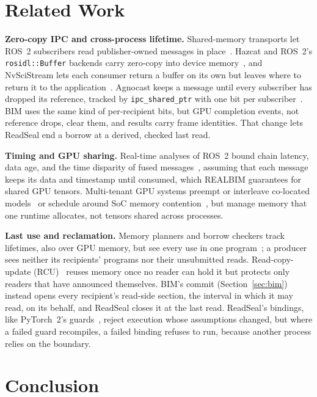 \documentclass[conference]{IEEEtran}
\newcommand{\sys}{REALBIM}
\newcommand{\code}[1]{\texttt{#1}}
\begin{document}
\section{Related Work}
\label{sec:related}

\textbf{Zero-copy IPC and cross-process lifetime.} Shared-memory transports let ROS~2 subscribers read publisher-owned messages in place~\cite{agnocast,luotcad}. Hazcat and ROS~2's \code{rosidl::Buffer} backends carry zero-copy into device memory~\cite{hazcat,cudabackend}, and NvSciStream lets each consumer return a buffer on its own but leaves where to return it to the application~\cite{nvscistream}. Agnocast keeps a message until every subscriber has dropped its reference, tracked by \code{ipc\_shared\_ptr} with one bit per subscriber~\cite{ipcsharedptr}. BIM uses the same kind of per-recipient bits, but GPU completion events, not reference drops, clear them, and results carry frame identities. That change lets ReadSeal end a borrow at a derived, checked last read.

\textbf{Timing and GPU sharing.} Real-time analyses of ROS~2 bound chain latency, data age, and the time disparity of fused messages~\cite{ros2survey}, assuming that each message keeps its data and timestamp until consumed, which \sys{} guarantees for shared GPU tensors. Multi-tenant GPU systems preempt or interleave co-located models~\cite{reef,orion} or schedule around SoC memory contention~\cite{haxconn}, but manage memory that one runtime allocates, not tensors shared across processes.

\textbf{Last use and reclamation.} Memory planners and borrow checkers track lifetimes, also over GPU memory, but see every use in one program~\cite{telamalloc,descend}; a producer sees neither its recipients' programs nor their unsubmitted reads. Read-copy-update (RCU)~\cite{rcu} reuses memory once no reader can hold it but protects only readers that have announced themselves. BIM's commit (Section~\ref{sec:bim}) instead opens every recipient's read-side section, the interval in which it may read, on its behalf, and ReadSeal closes it at the last read. ReadSeal's bindings, like PyTorch~2's guards~\cite{pytorch2}, reject execution whose assumptions changed, but where a failed guard recompiles, a failed binding refuses to run, because another process relies on the boundary.

\section{Conclusion}
\end{document}
